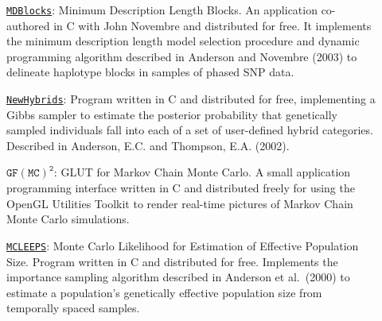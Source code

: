 \documentclass[11pt]{article}
\newlength{\postskip}
\begin{document}
\begin{description}
\item[]\href{http://ib.berkeley.edu/labs/slatkin/eriq/software/mdb_web/mdblocks.htm}{\texttt{MDBlocks}}: Minimum Description Length Blocks.  An application co-authored in C with John
Novembre and distributed for free.  It implements the minimum description length model selection
procedure and dynamic programming algorithm described in Anderson and Novembre (2003) to delineate
haplotype blocks in samples of phased SNP data.
\item[]\href{http://ib.berkeley.edu/labs/slatkin/eriq/software/software.htm}{\texttt{NewHybrids}}:  Program written in C and distributed for free, implementing a Gibbs
sampler to estimate the posterior probability that genetically sampled individuals fall into each of a
set of user-defined hybrid categories. Described in Anderson, E.C. and Thompson, E.A.
(2002).
\item[]\href{http://ib.berkeley.edu/labs/slatkin/eriq/software/software.htm}{$\mathtt{GF(MC)^2}$}: GLUT for Markov Chain Monte Carlo. A small application programming
interface written in C and distributed freely for using the OpenGL
Utilities Toolkit to render real-time pictures of Markov Chain Monte Carlo simulations.
\item[]\href{http://www.stat.washington.edu/thompson/Genepi/Mcleeps.shtml}{\texttt{MCLEEPS}}: Monte Carlo Likelihood for Estimation of Effective Population Size. Program
written in C and distributed for free. Implements the importance sampling
algorithm described in Anderson et al.~(2000) to estimate a
population's genetically effective population size from temporally spaced samples. 

\end{description}
\vspace*{\postskip}
\end{document}
